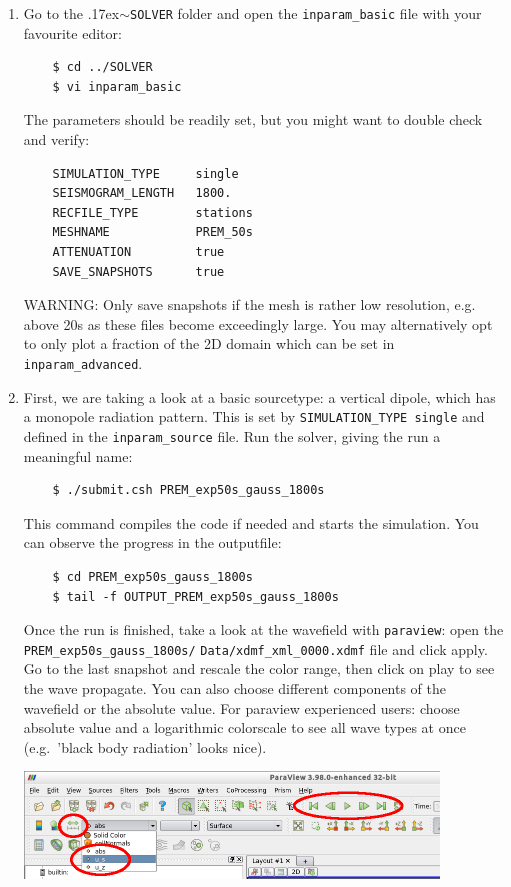 \documentclass{article}
\newcommand{\ttilde}[0]{\raise.17ex\hbox{$\scriptstyle\sim$}}
\begin{document}
\begin{enumerate}
    \item Go to the \ttilde\verb|SOLVER| folder and open the
    \verb|inparam_basic| file with your favourite editor:
    \begin{verbatim}
    $ cd ../SOLVER
    $ vi inparam_basic
    \end{verbatim}
    The parameters should be readily set, but you might want to double check and verify:
    \begin{verbatim}
    SIMULATION_TYPE     single
    SEISMOGRAM_LENGTH   1800.
    RECFILE_TYPE        stations 
    MESHNAME            PREM_50s
    ATTENUATION         true 
    SAVE_SNAPSHOTS      true  
    \end{verbatim}
    WARNING: Only save snapshots if the mesh is rather low resolution,
    e.g. above 20s as these files become exceedingly large. You may
    alternatively opt to only plot a fraction of the 2D domain which
    can be set in \verb|inparam_advanced|.

    \item First, we are taking a look at a basic sourcetype: a vertical dipole, which has
    a monopole radiation pattern. This is set by \verb|SIMULATION_TYPE single| and defined
    in the \verb|inparam_source| file. Run the solver, giving the run a meaningful name:
    \begin{verbatim}
    $ ./submit.csh PREM_exp50s_gauss_1800s
    \end{verbatim}
    This command compiles the code if needed and starts the simulation. You can observe
    the progress in the outputfile:
    \begin{verbatim}
    $ cd PREM_exp50s_gauss_1800s
    $ tail -f OUTPUT_PREM_exp50s_gauss_1800s
    \end{verbatim}
    Once the run is finished, take a look at the wavefield with \verb|paraview|: open
    the \verb|PREM_exp50s_gauss_1800s/| \verb|Data/xdmf_xml_0000.xdmf|
    file and click apply. Go to the last snapshot and rescale the color range,
    then click on play to see the wave propagate.  You can also choose
    different components of the wavefield or the absolute value.  For paraview
    experienced users: choose absolute value and a logarithmic colorscale to
    see all wave types at once (e.g.\ 'black body radiation' looks nice). 
   
    \begin{center}
    \includegraphics[width=110mm]{paraview2.png} \hspace{5mm}
    \end{center}


\end{enumerate}
\end{document}

